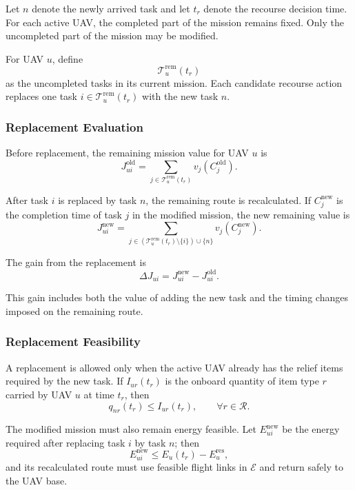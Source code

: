 \documentclass[conference]{IEEEtran}
\begin{document}
Let $n$ denote the newly arrived task and let $t_r$ denote the recourse decision time. For each active UAV, the completed part of the mission remains fixed. Only the uncompleted part of the mission may be modified.

For UAV $u$, define
\[
\mathcal{T}_u^{\mathrm{rem}}(t_r)
\]
as the uncompleted tasks in its current mission. Each candidate recourse action replaces one task $i\in\mathcal{T}_u^{\mathrm{rem}}(t_r)$ with the new task $n$.

\subsubsection{Replacement Evaluation}

Before replacement, the remaining mission value for UAV $u$ is
\begin{equation}
J_{ui}^{\mathrm{old}}
=
\sum_{j\in\mathcal{T}_u^{\mathrm{rem}}(t_r)}
v_j(C_j^{\mathrm{old}}).
\end{equation}

After task $i$ is replaced by task $n$, the remaining route is recalculated. If $C_j^{\mathrm{new}}$ is the completion time of task $j$ in the modified mission, the new remaining value is
\begin{equation}
J_{ui}^{\mathrm{new}}
=
\sum_{j\in(\mathcal{T}_u^{\mathrm{rem}}(t_r)\setminus\{i\})\cup\{n\}}
v_j(C_j^{\mathrm{new}}).
\end{equation}

The gain from the replacement is
\begin{equation}
\boxed{
\Delta J_{ui}
=
J_{ui}^{\mathrm{new}}
-
J_{ui}^{\mathrm{old}}
}.
\end{equation}

This gain includes both the value of adding the new task and the timing changes imposed on the remaining route.

\subsubsection{Replacement Feasibility}

A replacement is allowed only when the active UAV already has the relief items required by the new task. If $I_{ur}(t_r)$ is the onboard quantity of item type $r$ carried by UAV $u$ at time $t_r$, then
\begin{equation}
q_{nr}(t_r)
\leq
I_{ur}(t_r),
\qquad
\forall r\in\mathcal{R}.
\end{equation}

The modified mission must also remain energy feasible. Let $E_{ui}^{\mathrm{new}}$ be the energy required after replacing task $i$ by task $n$; then
\begin{equation}
E_{ui}^{\mathrm{new}}
\leq
E_u(t_r)-E_u^{\mathrm{res}},
\end{equation}
and its recalculated route must use feasible flight links in $\mathcal{E}$ and return safely to the UAV base.
\end{document}
